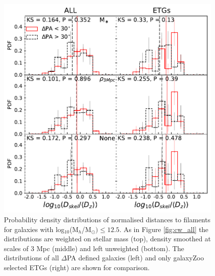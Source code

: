 \begin{figure}
	\includegraphics[width=\linewidth]{thesis/latex/halo_assembly_manga/PA_ALL_CW_Mh12_5.pdf}
    \caption[Probability density distributions of normalised distances to filaments for galaxies in MaNGA MPL-6.]{Probability density distributions of normalised distances to filaments for galaxies with log$_{10}$(M$_h$/M$_{\odot}) \le 12.5$. As in Figure \ref{fig:cw_all} the distributions are weighted on stellar mass (top), density smoothed at scales of 3 Mpc (middle) and left unweighted (bottom). The distributions of all $\Delta$PA defined galaxies (left) and only galaxyZoo selected ETGs (right) are shown for comparison.}
    \label{fig:mh_cw}
\end{figure}

